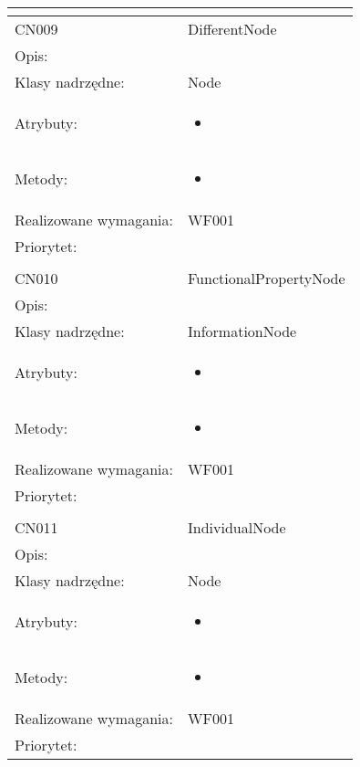 \documentclass[a4paper,10pt]{article}
\begin{document}
\begin{center}
\begin{tabular}{|m{3cm}|m{9cm}|}
\multicolumn{2}{c}{} \\
 \hline

CN009 & DifferentNode \\ \hline
Opis: &     \\ \hline
Klasy nadrzędne: & Node     \\ \hline
Atrybuty: & \begin{itemize}
 \item 
\end{itemize}
 \\ \hline
Metody: & \begin{itemize}
 \item 
\end{itemize}
  \\ \hline
Realizowane wymagania: & WF001 \\ \hline
Priorytet: &  \\ \hline

\multicolumn{2}{c}{} \\
 \hline

CN010 & FunctionalPropertyNode \\ \hline
Opis: &     \\ \hline
Klasy nadrzędne: & InformationNode     \\ \hline
Atrybuty: & \begin{itemize}
 \item 
\end{itemize}
 \\ \hline
Metody: & \begin{itemize}
 \item 
\end{itemize}
  \\ \hline
Realizowane wymagania: & WF001 \\ \hline
Priorytet: &  \\ \hline

\multicolumn{2}{c}{} \\
 \hline

CN011 & IndividualNode \\ \hline
Opis: &     \\ \hline
Klasy nadrzędne: & Node     \\ \hline
Atrybuty: & \begin{itemize}
 \item 
\end{itemize}
 \\ \hline
Metody: & \begin{itemize}
 \item 
\end{itemize}
  \\ \hline
Realizowane wymagania: & WF001 \\ \hline
Priorytet: &  \\ \hline


\end{tabular}
\end{center}
\end{document}
